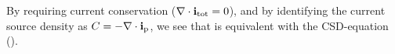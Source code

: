 By requiring current conservation ($\nabla\cdot{\bf i_\text{tot}}=0$), 
and by identifying the current source density as $C = -\nabla\cdot{\bf i}_\mathrm{p}$, 
we see that  is equivalent with the CSD-equation ().



%

%




